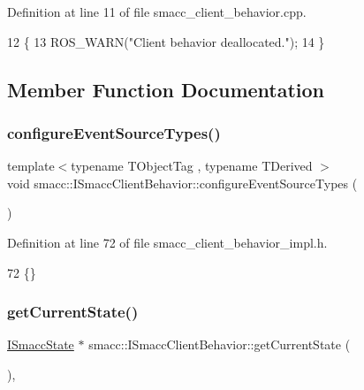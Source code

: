 Definition at line 11 of file smacc\+\_\+client\+\_\+behavior.\+cpp.


\begin{DoxyCode}
12     \{
13         ROS\_WARN(\textcolor{stringliteral}{"Client behavior deallocated."});
14     \}
\end{DoxyCode}


\subsection{Member Function Documentation}
\mbox{\label{classsmacc_1_1ISmaccClientBehavior_a9796c1ad9ee332b873813063fc93cb9a}} 
\subsubsection{\texorpdfstring{configure\+Event\+Source\+Types()}{configureEventSourceTypes()}}
{\footnotesize\ttfamily template$<$typename T\+Object\+Tag , typename T\+Derived $>$ \\
void smacc\+::\+I\+Smacc\+Client\+Behavior\+::configure\+Event\+Source\+Types (\begin{DoxyParamCaption}{ }\end{DoxyParamCaption})\hspace{0.3cm}{\ttfamily [private]}}



Definition at line 72 of file smacc\+\_\+client\+\_\+behavior\+\_\+impl.\+h.


\begin{DoxyCode}
72 \{\}
\end{DoxyCode}
\mbox{\label{classsmacc_1_1ISmaccClientBehavior_a34fde34e48fa13db622ee60d8374d0b8}} 
\subsubsection{\texorpdfstring{get\+Current\+State()}{getCurrentState()}}
{\footnotesize\ttfamily \hyperlink{classsmacc_1_1ISmaccState}{I\+Smacc\+State} $\ast$ smacc\+::\+I\+Smacc\+Client\+Behavior\+::get\+Current\+State (\begin{DoxyParamCaption}{ }\end{DoxyParamCaption})\hspace{0.3cm}{\ttfamily [inline]}, {\ttfamily [protected]}}



